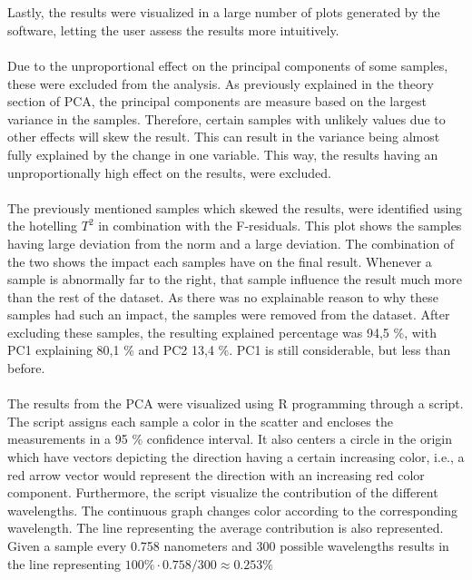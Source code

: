 \\\\
Lastly, the results were visualized in a large number of plots generated by the software, letting the user assess the results more intuitively. 
\\\\
Due to the unproportional effect on the principal components of some samples, these were excluded from the analysis. As previously explained in the theory section of PCA, the principal components are measure based on the largest variance in the samples. Therefore, certain samples with unlikely values due to other effects will skew the result. This can result in the variance being almost fully explained by the change in one variable. This way, the results having an unproportionally high effect on the results, were excluded.
\\\\%
The previously mentioned samples which skewed the results, were identified using the hotelling $T^2$ in combination with the F-residuals. This plot shows the samples having large deviation from the norm and a large deviation. The combination of the two shows the impact each samples have on the final result. Whenever a sample is abnormally far to the right, that sample influence the result much more than the rest of the dataset. As there was no explainable reason to why these samples had such an impact, the samples were removed from the dataset. After excluding these samples, the resulting explained percentage was 94,5 \%, with PC1 explaining 80,1 \% and PC2 13,4 \%. PC1 is still considerable, but less than before.
\\\\
The results from the PCA were visualized using R programming through a script. The script assigns each sample a color in the scatter and encloses the measurements in a 95 \% confidence interval. It also centers a circle in the origin which have vectors depicting the direction having a certain increasing color, i.e., a red arrow vector would represent the direction with an increasing red color component. Furthermore, the script visualize the contribution of the different wavelengths. The continuous graph changes color according to the corresponding wavelength. The line representing the average contribution is also represented. Given a sample every 0.758 nanometers and 300 possible wavelengths results in the line representing $100\% \cdot 0.758/300 \approx 0.253 \% $
